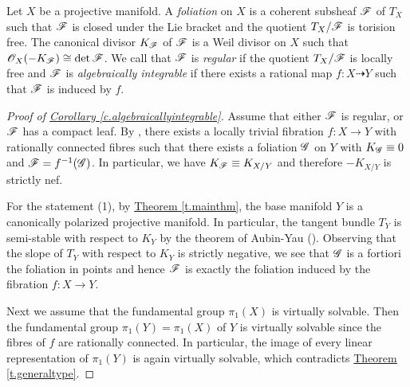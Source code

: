 Let $X$ be a projective manifold. A \emph{foliation} on $X$ is a coherent subsheaf $\mathscr F$ of $T_X$ such that $\mathscr F$ is closed under the Lie bracket and the quotient $T_X/\mathscr F$ is torision free. The canonical divisor $K_{\mathscr F}$ of $\mathscr F$ is a Weil divisor on $X$ such that $\mathscr O_X(-K_{\mathscr F})\cong \det\mathscr F$. We call that $\mathscr F$ is \emph{regular} if the quotient $T_{X}/\mathscr F$ is locally free and $\mathscr F$ is \emph{algebraically integrable} if there exists a rational map $f:X\dashrightarrow Y$ such that $\mathscr F$ is induced by $f$.


\begin{proof}[Proof of {\hyperref[c.algebraicallyintegrable]{Corollary \ref*{c.algebraicallyintegrable}}}]
	Assume that either $\mathscr F$ is regular, or $\mathscr F$ has a compact leaf. By \cite[Theorem 1.1]{Ou21}, there exists a locally trivial fibration $f:X\rightarrow Y$ with rationally connected fibres such that there exists a foliation $\mathscr G$ on $Y$ with $K_{\mathscr G}\equiv 0$ and $\mathscr F=f^{-1}(\mathscr G)$. In particular, we have $K_{\mathscr F}\equiv K_{X/Y}$ and therefore $-K_{X/Y}$ is strictly nef. 
	
	For the statement (1), by {\hyperref[t.mainthm]{Theorem \ref*{t.mainthm}}}, the base manifold $Y$ is a canonically polarized projective manifold. In particular, the tangent bundle $T_Y$ is semi-stable with respect to $K_Y$ by the theorem of Aubin-Yau (\cite{Aub78,Yau78}). Observing that the slope of $T_Y$ with respect to $K_Y$ is strictly negative, we see that $\mathscr G$ is a fortiori the foliation in points and hence $\mathscr F$ is exactly the foliation induced by the fibration $f:X\rightarrow Y$.
	
	Next we assume that the fundamental group $\pi_1(X)$ is virtually solvable. Then the fundamental group $\pi_1(Y)=\pi_1(X)$ of $Y$ is virtually solvable since the fibres of $f$ are rationally connected. In particular, the image of every linear representation of $\pi_1(Y)$ is again virtually solvable, which contradicts {\hyperref[t.generaltype]{Theorem  \ref*{t.generaltype}}}.
\end{proof}







